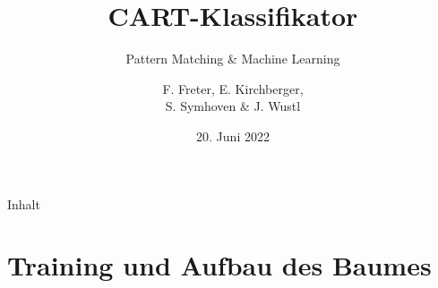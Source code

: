 \documentclass{beamer}
\title{CART-Klassifikator}
\subtitle{Pattern Matching \& Machine Learning}
\author{F. Freter, E. Kirchberger,\\S. Symhoven \& J. Wustl}
\institute{Sommersemester 2023}
\date{20. Juni 2022}
\begin{document}

\begin{frame}
	\maketitle %
\end{frame}


\begin{frame}{Inhalt}
	\tableofcontents %
\end{frame}




\section{Training und Aufbau des Baumes}
 
\end{document}
